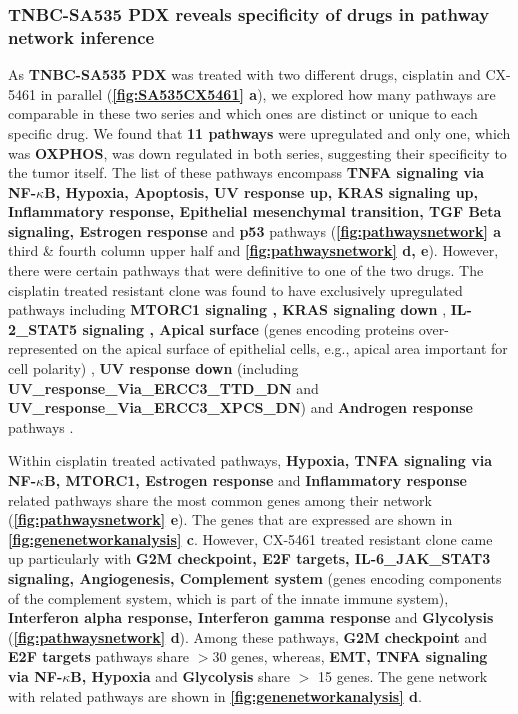 
\subsubsection{TNBC-SA535 PDX reveals specificity of drugs in pathway network inference} 
As \textbf{TNBC-SA535 PDX} was treated with two different drugs, cisplatin and CX-5461 in parallel (\textbf{\autoref{fig:SA535CX5461} a}), we explored how many pathways are comparable in these two series and which ones are distinct or unique to each specific drug. 
We found that \textbf{11 pathways} were upregulated and only one, which was \textbf{\ac{OXPHOS}}, was down regulated in both series, suggesting their specificity to the tumor itself. The list of these pathways encompass \textbf{TNFA signaling via NF-$\kappa$B, Hypoxia, Apoptosis, UV response up, KRAS signaling up, Inflammatory response, Epithelial mesenchymal transition, TGF Beta signaling, Estrogen response} and \textbf{p53} pathways ({\textbf{\autoref{fig:pathwaysnetwork} a} third \& fourth column upper half and \textbf{\autoref{fig:pathwaysnetwork} d, e}). However, there were certain pathways that were definitive to one of the two drugs. The cisplatin treated resistant clone was found to have exclusively upregulated pathways including \textbf{MTORC1 signaling \cite{peng2010role}, KRAS signaling down} \cite{tao2014oncogenic}, \textbf{IL-2\_STAT5 signaling \cite{wu2020activation, gutierrez2020role}, Apical surface} (genes encoding proteins over-represented on the apical surface of epithelial cells, e.g., apical area important for cell polarity) \cite{halaoui2015rewiring, wodarz2007cell}, \textbf{UV response down} (including \textbf{UV\_response\_Via\_ERCC3\_TTD\_DN}
and \textbf{UV\_response\_Via\_ERCC3\_XPCS\_DN}) and \textbf{Androgen response} pathways \cite{rampurwala2016role, michmerhuizen2020we}.}

Within cisplatin treated activated pathways, \textbf{Hypoxia, TNFA signaling via NF-$\kappa$B, MTORC1, Estrogen response} and \textbf{Inflammatory response} related pathways share the most common genes among their network (\textbf{\autoref{fig:pathwaysnetwork} e}). The genes that are expressed are shown in  \textbf{\autoref{fig:genenetworkanalysis} c}. However, CX-5461 treated resistant clone came up particularly with \textbf{G2M checkpoint, E2F targets, IL-6\_JAK\_STAT3 signaling, Angiogenesis, Complement system} (genes encoding components of the complement system, which is part of the innate immune system), \textbf{Interferon alpha response, Interferon gamma response} and \textbf{Glycolysis} (\textbf{\autoref{fig:pathwaysnetwork} d}). Among these pathways, \textbf{G2M checkpoint} and \textbf{E2F targets} pathways share $>$30 genes, whereas, \textbf{\ac{EMT}, TNFA signaling via NF-$\kappa$B, Hypoxia} and \textbf{Glycolysis} share $>$ 15 genes. The gene network with related pathways are shown in  \textbf{\autoref{fig:genenetworkanalysis} d}. 

